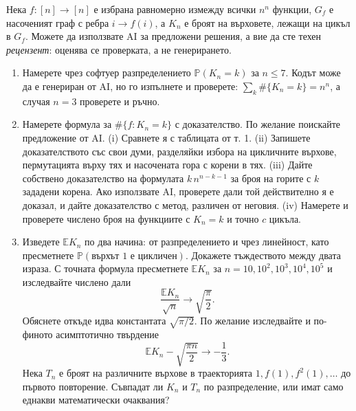\documentclass[11pt,a4paper]{article}
\newenvironment{enumeratea}{\begin{enumerate}[label=(\alph*),itemsep=0.28em,topsep=0.25em]}{\end{enumerate}}
\newcommand{\Pbb}{\mathbb P}
\newcommand{\Ebb}{\mathbb E}
\begin{document}
\begin{researchtask}
Нека $f:[n]\to[n]$ е избрана равномерно измежду всички $n^n$ функции, $G_f$ е
насоченият граф с ребра $i\to f(i)$, а $K_n$ е броят на върховете, лежащи на
цикъл в $G_f$. Можете да използвате AI за предложени решения, а вие да сте
техен \emph{рецензент}: оценява се проверката, а не генерирането.
\begin{enumeratea}
  \item Намерете чрез софтуер разпределението $\Pbb(K_n=k)$ за $n\le 7$.
  Кодът може да е генериран от AI, но го изпълнете и проверете:
  $\sum_k\#\{K_n=k\}=n^n$, а случая $n=3$ проверете и ръчно.
  \item Намерете формула за $\#\{f:K_n=k\}$ с доказателство.
  По желание поискайте предложение от AI.
  (i) Сравнете я с таблицата от т. 1. (ii) Запишете доказателството със свои
  думи, разделяйки избора на цикличните върхове, пермутацията върху тях и
  насочената гора с корени в тях. (iii) Дайте собствено доказателство на
  формулата $k\,n^{n-k-1}$ за броя на горите с $k$ зададени корена.
  Ако използвате AI, проверете дали той действително я е доказал, и дайте
  доказателство с метод, различен от неговия.
  (iv) Намерете и проверете числено броя на функциите с $K_n=k$ и точно $c$
  цикъла.
  \item Изведете $\Ebb K_n$ по два начина: от разпределението и чрез линейност,
  като пресметнете $\Pbb(\text{върхът }1\text{ е цикличен})$. Докажете
  тъждеството между двата израза. С точната формула пресметнете $\Ebb K_n$ за
  $n=10,10^2,10^3,10^4,10^5$ и изследвайте числено дали
  \[
  \frac{\Ebb K_n}{\sqrt n}\longrightarrow\sqrt{\frac{\pi}{2}}.
  \]
  Обяснете откъде идва константата $\sqrt{\pi/2}$. По желание изследвайте и
  по-финото асимптотично твърдение
  \[
  \Ebb K_n-\sqrt{\frac{\pi n}{2}}\longrightarrow-\frac13.
  \]
  Нека $T_n$ е броят на различните върхове в траекторията
  $1,f(1),f^2(1),\dots$ до първото повторение. Съвпадат ли $K_n$ и $T_n$ по
  разпределение, или имат само еднакви математически очаквания?
\end{enumeratea}
\end{researchtask}
\end{document}
